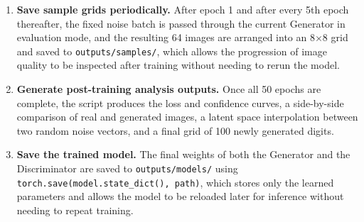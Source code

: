 \documentclass[12pt,a4paper]{article}
\begin{document}
\begin{enumerate}
          training set is processed once using the two-step update procedure described in
          Section~4.4. The average Generator loss, Discriminator loss, and Discriminator
          confidence on real and fake images are accumulated across all batches in the
          epoch and printed to the console at the end of the epoch.
    \item \textbf{Save sample grids periodically.} After epoch 1 and after every 5th
          epoch thereafter, the fixed noise batch is passed through the current Generator
          in evaluation mode, and the resulting 64 images are arranged into an
          8$\times$8 grid and saved to \texttt{outputs/samples/}, which allows the
          progression of image quality to be inspected after training without needing to
          rerun the model.
    \item \textbf{Generate post-training analysis outputs.} Once all 50 epochs are
          complete, the script produces the loss and confidence curves, a side-by-side
          comparison of real and generated images, a latent space interpolation between
          two random noise vectors, and a final grid of 100 newly generated digits.
    \item \textbf{Save the trained model.} The final weights of both the Generator and
          the Discriminator are saved to \texttt{outputs/models/} using
          \texttt{torch.save(model.state\_dict(), path)}, which stores only the learned
          parameters and allows the model to be reloaded later for inference without
          needing to repeat training.
\end{enumerate}
\end{document}
